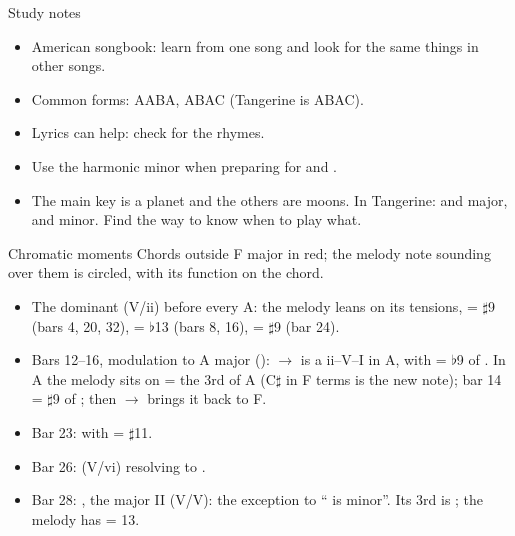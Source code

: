 \begin{study}{Study notes}
\begin{itemize}\setlength{\itemsep}{0pt}
\item American songbook: learn from one song and look for the same things in other songs.
\item Common forms: AABA, ABAC (Tangerine is ABAC).
\item Lyrics can help: check for the rhymes.
\item Use the harmonic minor when preparing for  and .
\item The main key is a planet and the others are moons. In Tangerine:
   and  major,  and  minor. Find the way to know when to play what.
\end{itemize}
\end{study}

\begin{study}{Chromatic moments}
Chords outside F major in \textcolor{chromatic}{red}; the melody note sounding over them
is circled, with its function on the chord.
\begin{itemize}\setlength{\itemsep}{0pt}
\item The dominant  (V/ii) before every A: the melody leans on its tensions,
   = $\sharp$9 (bars 4, 20, 32),  = $\flat$13 (bars 8, 16),  = $\sharp$9 (bar 24).
\item Bars 12--16, modulation to A major ():   $\to$ 
  is a ii--V--I in A, with  = $\flat$9 of . In A the melody sits on
   = the 3rd of A (C$\sharp$ in F terms is the new note); bar 14  = $\sharp$9 of ;
  then  $\to$  brings it back to F.
\item Bar 23:  with  = $\sharp$11.
\item Bar 26:  (V/vi) resolving to .
\item Bar 28: , the major II (V/V): the exception to `` is minor''. Its 3rd is
  ; the melody has  = 13.
\end{itemize}
\end{study}
